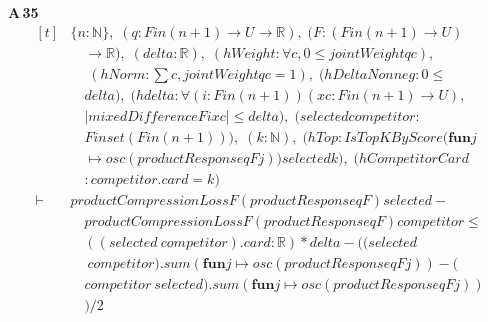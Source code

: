 \noindent\textbf{A\,35}\quad{}
{\footnotesize\[ \begin{aligned}[t]
&\{ \mathit{n} : \mathbb{N} \},\; (\mathit{q} : \mathit{Fin} (\mathit{n} + 1) \to \mathit{U} \to \mathbb{R} ),\; (\mathit{F} : (\mathit{Fin} (\mathit{n} + 1) \to \mathit{U})\\
&\quad \to \mathbb{R} ),\; (\mathit{delta} : \mathbb{R} ),\; (\mathit{hWeight} : \forall \mathit{c}, 0 \leq \mathit{jointWeight} \mathit{q} \mathit{c}),\\
&\quad \; (\mathit{hNorm} : \textstyle\sum \mathit{c}, \mathit{jointWeight} \mathit{q} \mathit{c} = 1),\; (\mathit{hDeltaNonneg} : 0 \leq\\
&\quad \mathit{delta}),\; (\mathit{hdelta} : \forall (\mathit{i} : \mathit{Fin} (\mathit{n} + 1)) (\mathit{x} \mathit{c} : \mathit{Fin} (\mathit{n} + 1) \to \mathit{U}),\\
&\quad |\mathit{mixedDifference} \mathit{F} \mathit{i} \mathit{x} \mathit{c}| \leq \mathit{delta}),\; (\mathit{selected} \mathit{competitor} :\\
&\quad \mathit{Finset} (\mathit{Fin} (\mathit{n} + 1))),\; (\mathit{k} : \mathbb{N} ),\; (\mathit{hTop} : \mathit{IsTopKByScore} (\mathbf{fun} \mathit{j}\\
&\quad \mapsto \mathit{osc} (\mathit{productResponse} \mathit{q} \mathit{F} \mathit{j})) \mathit{selected} \mathit{k}),\; (\mathit{hCompetitorCard}\\
&\quad : \mathit{competitor}.\mathit{card} = \mathit{k})\\
\vdash\;&\mathit{productCompressionLoss} \mathit{F} (\mathit{productResponse} \mathit{q} \mathit{F}) \mathit{selected} -\\
&\quad \mathit{productCompressionLoss} \mathit{F} (\mathit{productResponse} \mathit{q} \mathit{F}) \mathit{competitor} \leq\\
&\quad ((\mathit{selected} \ \mathit{competitor}).\mathit{card} : \mathbb{R} ) * \mathit{delta} - ((\mathit{selected}\\
&\quad \ \mathit{competitor}).\mathit{sum} (\mathbf{fun} \mathit{j} \mapsto \mathit{osc} (\mathit{productResponse} \mathit{q} \mathit{F} \mathit{j})) - (\\
&\quad \mathit{competitor} \ \mathit{selected}).\mathit{sum} (\mathbf{fun} \mathit{j} \mapsto \mathit{osc} (\mathit{productResponse} \mathit{q} \mathit{F} \mathit{j}))\\
&\quad ) / 2
\end{aligned} \]}

